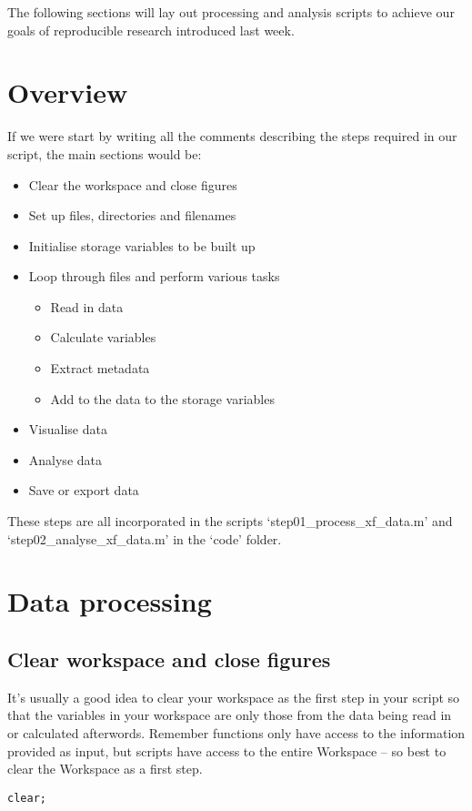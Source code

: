 \documentclass[12pt,a4paper]{article}
\begin{document}
The following sections will lay out processing and analysis scripts to achieve our goals of reproducible research introduced last week.

\section{Overview}
If we were start by writing all the comments describing the steps required in our script, the main sections would be:
\begin{itemize}
	\item Clear the workspace and close figures
	\item Set up files, directories and filenames
	\item Initialise storage variables to be built up
	\item Loop through files and perform various tasks
		\begin{itemize}
			\item Read in data
			\item Calculate variables
			\item Extract metadata
			\item Add to the data to the storage variables
		\end{itemize}
	\item Visualise data
	\item Analyse data
	\item Save or export data
\end{itemize}

These steps are all incorporated in the scripts `step01\_process\_xf\_data.m' and `step02\_analyse\_xf\_data.m' in the `code' folder.

\section{Data processing}
\subsection{Clear workspace and close figures}
It's usually a good idea to clear your workspace as the first step in your script so that the variables in your workspace are only those from the data being read in or calculated afterwords.
Remember functions only have access to the information provided as input, but scripts have access to the entire Workspace – so best to clear the Workspace as a first step.
\begin{lstlisting}[style=Matlab-editor]
clear;
\end{lstlisting}
\end{document}

